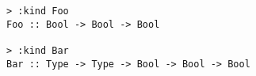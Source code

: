 \begin{repl}\begin{lstlisting}
> :kind Foo
Foo :: Bool -> Bool -> Bool

> :kind Bar
Bar :: Type -> Type -> Bool -> Bool -> Bool\end{lstlisting}\end{repl}
